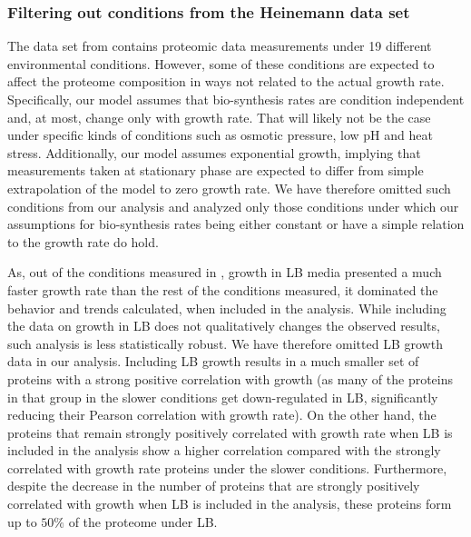 \documentclass[notitlepage]{article}
\begin{document}
\subsubsection{Filtering out conditions from the Heinemann data set}
\label{heinemanncond}
The data set from \cite{Heinemann2014} contains proteomic data measurements under 19 different environmental conditions.
However, some of these conditions are expected to affect the proteome composition in ways not related to the actual growth rate.
Specifically, our model assumes that bio-synthesis rates are condition independent and, at most, change only with growth rate.
That will likely not be the case under specific kinds of conditions such as osmotic pressure, low pH and heat stress.
Additionally, our model assumes exponential growth, implying that measurements taken at stationary phase are expected to differ from simple extrapolation of the model to zero growth rate.
We have therefore omitted such conditions from our analysis and analyzed only those conditions under which our assumptions for bio-synthesis rates being either constant or have a simple relation to the growth rate do hold.

As, out of the conditions measured in \cite{Heinemann2014}, growth in LB media presented a much faster growth rate than the rest of the conditions measured, it dominated the behavior and trends calculated, when included in the analysis.
While including the data on growth in LB does not qualitatively changes the observed results, such analysis is less statistically robust.
We have therefore omitted LB growth data in our analysis.
Including LB growth results in a much smaller set of proteins with a strong positive correlation with growth (as many of the proteins in that group in the slower conditions get down-regulated in LB, significantly reducing their Pearson correlation with growth rate).
On the other hand, the proteins that remain strongly positively correlated with growth rate when LB is included in the analysis show a higher correlation compared with the strongly correlated with growth rate proteins under the slower conditions.
Furthermore, despite the decrease in the number of proteins that are strongly positively correlated with growth when LB is included in the analysis, these proteins form up to $50\%$ of the proteome under LB.
\end{document}

